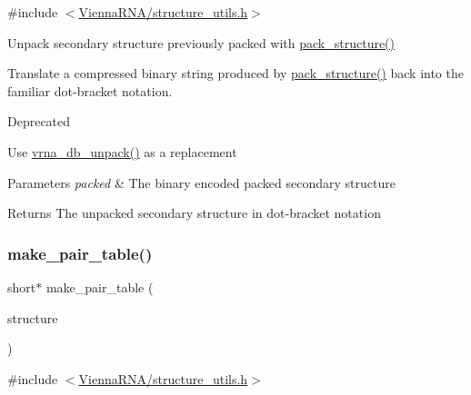 {\ttfamily \#include $<$\mbox{\hyperlink{structure__utils_8h}{Vienna\+R\+N\+A/structure\+\_\+utils.\+h}}$>$}



Unpack secondary structure previously packed with \mbox{\hyperlink{group__struct__utils_gac6dfa5e22928c087c6e09ff0054a7ced}{pack\+\_\+structure()}} 

Translate a compressed binary string produced by \mbox{\hyperlink{group__struct__utils_gac6dfa5e22928c087c6e09ff0054a7ced}{pack\+\_\+structure()}} back into the familiar dot-\/bracket notation.

\begin{DoxyRefDesc}{Deprecated}
\item[\mbox{\hyperlink{deprecated__deprecated000139}{Deprecated}}]Use \mbox{\hyperlink{group__struct__utils_ga6490adff857d84ce06e6f379ae3a4512}{vrna\+\_\+db\+\_\+unpack()}} as a replacement \end{DoxyRefDesc}

\begin{DoxyParams}{Parameters}
{\em packed} & The binary encoded packed secondary structure \\
\hline
\end{DoxyParams}
\begin{DoxyReturn}{Returns}
The unpacked secondary structure in dot-\/bracket notation 
\end{DoxyReturn}
\mbox{\label{group__struct__utils_ga89c32307ee50a0026f4a3131fac0845a}} 
\subsubsection{\texorpdfstring{make\+\_\+pair\+\_\+table()}{make\_pair\_table()}}
{\footnotesize\ttfamily short$\ast$ make\+\_\+pair\+\_\+table (\begin{DoxyParamCaption}\item[{const char $\ast$}]{structure }\end{DoxyParamCaption})}



{\ttfamily \#include $<$\mbox{\hyperlink{structure__utils_8h}{Vienna\+R\+N\+A/structure\+\_\+utils.\+h}}$>$}



